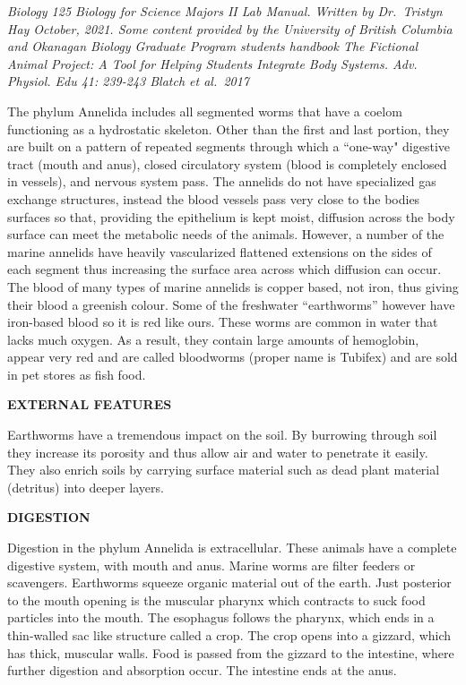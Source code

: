 \documentclass[
]{book}
\begin{document}
\emph{Biology 125 Biology for Science Majors II Lab Manual. Written by Dr.~Tristyn Hay October, 2021. Some content provided by the University of British Columbia and Okanagan Biology Graduate Program students handbook The Fictional Animal Project: A Tool for Helping Students Integrate Body Systems. Adv. Physiol. Edu 41: 239-243 Blatch et al.~2017}

The phylum Annelida includes all segmented worms that have a coelom functioning as a hydrostatic skeleton. Other than the first and last portion, they are built on a pattern of repeated segments through which a ``one-way" digestive tract (mouth and anus), closed circulatory system (blood is completely enclosed in vessels), and nervous system pass. The annelids do not have specialized gas exchange structures, instead the blood vessels pass very close to the bodies surfaces so that, providing the epithelium is kept moist, diffusion across the body surface can meet the metabolic needs of the animals. However, a number of the marine annelids have heavily vascularized flattened extensions on the sides of each segment thus increasing the surface area across which diffusion can occur. The blood of many types of marine annelids is copper based, not iron, thus giving their blood a greenish colour. Some of the freshwater ``earthworms'' however have iron-based blood so it is red like ours. These worms are common in water that lacks much oxygen. As a result, they contain large amounts of hemoglobin, appear very red and are called bloodworms (proper name is Tubifex) and are sold in pet stores as fish food.

\textbf{EXTERNAL FEATURES}

Earthworms have a tremendous impact on the soil. By burrowing through soil they increase its porosity and thus allow air and water to penetrate it easily. They also enrich soils by carrying surface material such as dead plant material (detritus) into deeper layers.

\textbf{DIGESTION}

Digestion in the phylum Annelida is extracellular. These animals have a complete digestive system, with mouth and anus. Marine worms are filter feeders or scavengers. Earthworms squeeze organic material out of the earth. Just posterior to the mouth opening is the muscular pharynx which contracts to suck food particles into the mouth. The esophagus follows the pharynx, which ends in a thin-walled sac like structure called a crop. The crop opens into a
gizzard, which has thick, muscular walls. Food is passed from the gizzard to the intestine, where
further digestion and absorption occur. The intestine ends at the anus.
\end{document}
